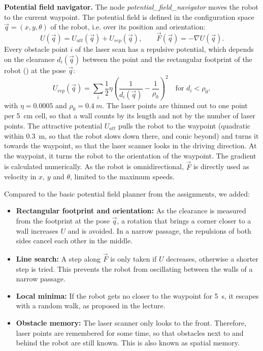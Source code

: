 \documentclass[../report.tex]{subfiles}
\begin{document}
    \textbf{Potential field navigator.}
    The node \emph{potential\_field\_navigator} moves the robot to the current waypoint.
    The potential field is defined in the configuration space $\vec{q} = (x, y, \theta)$ of the robot, i.e. over its position and orientation:
    \begin{equation}
        U(\vec{q}) = U_{att}(\vec{q}) + U_{rep}(\vec{q}), \qquad \vec{F}(\vec{q}) = -\nabla U(\vec{q}).
        \label{eq:potential}
    \end{equation}
    Every obstacle point $i$ of the laser scan has a repulsive potential, which depends on the clearance $d_i(\vec{q})$ between the point and the rectangular footprint of the robot () at the pose $\vec{q}$:
    \begin{equation}
        U_{rep}(\vec{q}) = \sum_i \frac{1}{2} \eta \left( \frac{1}{d_i(\vec{q})} - \frac{1}{\rho_0} \right)^2 \quad \text{for } d_i < \rho_0,
        \label{eq:repulsion}
    \end{equation}
    with $\eta = 0.0005$ and $\rho_0 = \SI{0.4}{m}$.
    The laser points are thinned out to one point per \SI{5}{cm} cell, so that a wall counts by its length and not by the number of laser points.
    The attractive potential $U_{att}$ pulls the robot to the waypoint (quadratic within \SI{0.3}{m}, so that the robot slows down there, and conic beyond) and turns it towards the waypoint, so that the laser scanner looks in the driving direction. At the waypoint, it turns the robot to the orientation of the waypoint.
    The gradient is calculated numerically. As the robot is omnidirectional, $\vec{F}$ is directly used as velocity in $x$, $y$ and $\theta$, limited to the maximum speeds.

    Compared to the basic potential field planner from the assignments, we added:
    \begin{itemize}
        \item \textbf{Rectangular footprint and orientation:} As the clearance is measured from the footprint at the pose $\vec{q}$, a rotation that brings a corner closer to a wall increases $U$ and is avoided. In a narrow passage, the repulsions of both sides cancel each other in the middle.
        \item \textbf{Line search:} A step along $\vec{F}$ is only taken if $U$ decreases, otherwise a shorter step is tried. This prevents the robot from oscillating between the walls of a narrow passage.
        \item \textbf{Local minima:} If the robot gets no closer to the waypoint for \SI{5}{s}, it escapes with a random walk, as proposed in the lecture.
        \item \textbf{Obstacle memory:} The laser scanner only looks to the front. Therefore, laser points are remembered for some time, so that obstacles next to and behind the robot are still known. This is also known as spatial memory.
    \end{itemize}
\end{document}
